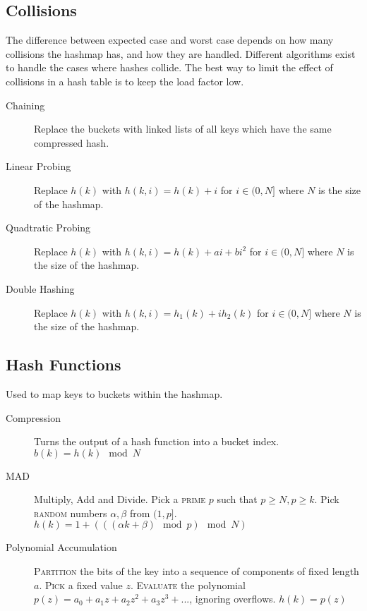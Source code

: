 \documentclass[landscape]{cheat}
\begin{document}
\begin{multicols}{3}
\subsection{Collisions}
The difference between expected case and worst case depends on how many collisions the hashmap has, and how they are handled.
Different algorithms exist to handle the cases where hashes collide.
The best way to limit the effect of collisions in a hash table is to keep the load factor low.
\begin{description}
    \item[Chaining] Replace the buckets with linked lists of all keys which have the same compressed hash.
    \item[Linear Probing] Replace $h(k)$ with $h(k, i) = h(k) + i$ for $i \in (0,N]$ where $N$ is the size of the hashmap.
    \item[Quadtratic Probing] Replace $h(k)$ with $h(k, i) = h(k) + ai + bi^2$ for $i \in (0,N]$ where $N$ is the size of the hashmap.
    \item[Double Hashing] Replace $h(k)$ with $h(k, i) = h_1(k) + ih_2(k)$ for $i \in (0,N]$ where $N$ is the size of the hashmap.
\end{description}

\subsection{Hash Functions}
Used to map keys to buckets within the hashmap.
\begin{description}
    \item[Compression] Turns the output of a hash function into a bucket index.
        $b(k) = h(k) \mod N$
    \item[MAD] Multiply, Add and Divide.
        Pick a \textsc{prime} $p$ such that $p \geq N, p \geq k$.
        Pick \textsc{random} numbers $\alpha, \beta$ from $(1, p]$.
        $h(k) = 1 + (((\alpha k + \beta) \mod p) \mod N)$
    \item[Polynomial Accumulation] \textsc{Partition} the bits of the key into a sequence of components of fixed length $a$.
        \textsc{Pick} a fixed value $z$.
        \textsc{Evaluate} the polynomial $p(z) = a_0 + a_1z + a_2z^2 + a_3z^3+...$, ignoring overflows.
        $h(k) = p(z)$

\end{description}

\end{multicols}
\end{document}
